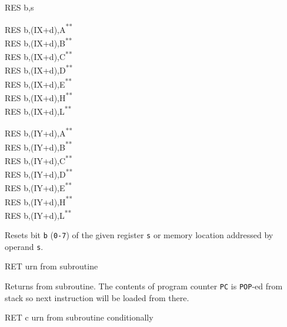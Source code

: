 \documentclass[12pt,twoside,openright,a4paper]{book}
\newcommand{\UNDOC}{\textnormal{\textsuperscript{**}}}
\begin{document}
\begin{basedescript}{
	\desclabelstyle{\multilinelabel}
	\desclabelwidth{3cm}}
\begin{DetailItem}{RES b,s}
\begin{DetailVariants}
			\columnbreak
			RES b,(IX+d),A\UNDOC\\
			RES b,(IX+d),B\UNDOC\\
			RES b,(IX+d),C\UNDOC\\
			RES b,(IX+d),D\UNDOC\\
			RES b,(IX+d),E\UNDOC\\
			RES b,(IX+d),H\UNDOC\\
			RES b,(IX+d),L\UNDOC

			\columnbreak
			RES b,(IY+d),A\UNDOC\\
			RES b,(IY+d),B\UNDOC\\
			RES b,(IY+d),C\UNDOC\\
			RES b,(IY+d),D\UNDOC\\
			RES b,(IY+d),E\UNDOC\\
			RES b,(IY+d),H\UNDOC\\
			RES b,(IY+d),L\UNDOC
		\end{DetailVariants}

		Resets bit {\tt b} ({\tt 0-7}) of the given register {\tt s} or memory location addressed by operand {\tt s}.

		\DetailNoEffect
						
		\begin{DetailTiming}
		\end{DetailTiming}

	\end{DetailItem}

	\pagebreak
	\begin{DetailItem}{RET}
		{urn from subroutine}
		{\SymRET}

		Returns from subroutine. The contents of program counter {\tt PC} is {\tt POP}-ed from stack so next instruction will be loaded from there.

		\DetailNoEffect
				
		\begin{DetailTiming}
			\DetailTime{}{3}{10}
		\end{DetailTiming}

	\end{DetailItem}

	\begin{DetailItem}{RET c}
		{urn from subroutine conditionally}
		{\SymRETc{c}}


\end{DetailItem}
\end{basedescript}
\end{document}
